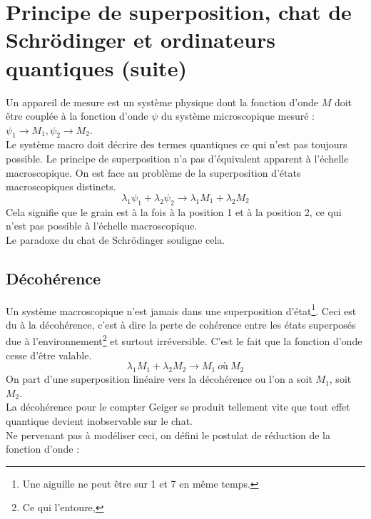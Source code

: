 \documentclass	[11pt, a4paper, openany]{book}
\begin{document}
	\setcounter{section}{6}
	\section{Principe de superposition, chat de Schrödinger et ordinateurs quantiques (suite)}
	Un appareil de mesure est un système physique dont la fonction d'onde $M$ doit être couplée à la fonction d'onde $\psi$ du système microscopique mesuré : $\psi_1 \rightarrow M_1, \psi_2 \rightarrow M_2$.\\
	Le système macro doit décrire des termes quantiques ce qui n'est pas toujours possible. Le principe de superposition n'a pas d'équivalent apparent à l'échelle macroscopique. On est face au problème de la superposition d'états macroscopiques distincts.
	\begin{equation}
		\lambda_1\psi_1 + \lambda_2\psi_2 \rightarrow \lambda_1M_1 + \lambda_2M_2
	\end{equation}
	Cela signifie que le grain est à la fois à la position 1 et à la position 2, ce qui n'est pas possible à l'échelle macroscopique.\\
	Le paradoxe du chat de Schrödinger souligne cela.
	
	\subsection*{Décohérence}
	Un système macroscopique n'est jamais dans une superposition d'état\footnote{Une aiguille ne peut être sur 1 et 7 en même temps.}. Ceci est du à la décohérence, c'est à dire la perte de cohérence entre les états superposés due à l'environnement\footnote{Ce qui l'entoure, } et surtout irréversible. C'est le fait que la fonction d'onde cesse d'être valable.
	\begin{equation}
		\lambda_1M_1 + \lambda_2M_2 \rightarrow M_1\ \textit{où}\ M_2
	\end{equation}
	On part d'une superposition linéaire vers la décohérence ou  l'on a soit $M_1$, soit $M_2$.\\
	La décohérence pour le compter Geiger se produit tellement vite que tout effet quantique devient inobservable sur le chat.\\
	Ne pervenant pas à modéliser ceci, on défini le postulat de réduction de la fonction d'onde :\\
	
\end{document}
